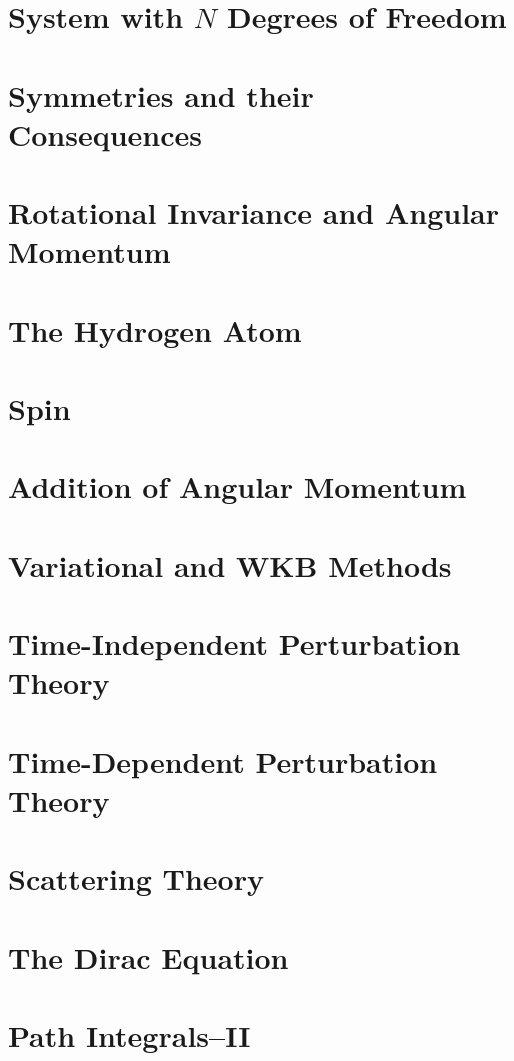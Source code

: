 \documentclass[10pt,twocolumn,leqno]{article}
\theoremstyle{theorem}
\theoremstyle{example}
\theoremstyle{exercise}
\numberwithin{equation}{subsection}
\begin{document}
\section{System with $N$ Degrees of Freedom}


\section{Symmetries and their Consequences}


\section{Rotational Invariance and Angular Momentum}


\section{The Hydrogen Atom}


\section{Spin}


\section{Addition of Angular Momentum}


\section{Variational and WKB Methods}


\section{Time-Independent Perturbation Theory}


\section{Time-Dependent Perturbation Theory}


\section{Scattering Theory}


\section{The Dirac Equation}


\section{Path Integrals--II}


\appendix

\end{document}
